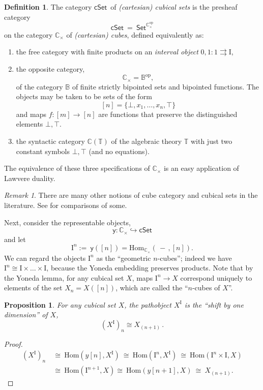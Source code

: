 \documentclass[12pt]{article}
\newcommand{\C}{\ensuremath{\mathbb{C}}}
\newcommand{\B}{\ensuremath{\mathbb{B}}}
\newcommand{\T}{\ensuremath{\mathbb{T}}}
\newcommand{\psh}[1]{\ensuremath{\mathsf{Set}^{#1^{\mathrm{op}}}}}
\newcommand{\op}[1]{\ensuremath{#1^{\mathrm{op}}}}
\newcommand{\cSet}{\ensuremath{\mathsf{cSet}}}
\newcommand{\y}{\ensuremath{\mathsf{y}}} %
\newcommand{\Hom}{\ensuremath{\mathrm{Hom}}}
\renewcommand{\hom}{\ensuremath{\mathrm{Hom}}}
\newcommand{\hook}{\ensuremath{\hookrightarrow}}
\newcommand{\I}{\ensuremath{\mathrm{I}}}
\newtheorem{proposition}[theorem]{Proposition}
\theoremstyle{remark}
\newtheorem{remark}[theorem]{Remark}
\theoremstyle{definition}
\newtheorem{definition}[theorem]{Definition}
\begin{document}
\begin{definition}
The category \cSet\ of \emph{(cartesian) cubical sets} is the presheaf category
\[
\cSet\ =\ \psh{\C_\times}
\]
on the category $\C_\times$ of \emph{(cartesian) cubes}, defined equivalently as:
\begin{enumerate}
\item the free category with finite products on an \emph{interval object} $0,1 : 1\rightrightarrows \I$,
\item the opposite category,
\[
\C_\times = \op{\B},
\]
of the category $\B$ of finite strictly bipointed sets and bipointed functions.  The objects may be taken to be sets of the form $$[n] = \{\bot, x_1, \dots, x_n, \top\}$$ and maps $f : [m]\to [n]$ are functions that preserve the distinguished elements $\bot, \top$.

\item  the syntactic category $\C(\T)$ of the algebraic theory $\T$ with just two constant symbols $\bot, \top$ (and no equations).
\end{enumerate}
The equivalence of these three specifications of $\C_\times$ is an easy application of Lawvere duality.
\end{definition}

\begin{remark} There are many other notions of cube category and cubical sets in the literature. See \cite{awodey:cubes} for  comparisons of some.
\end{remark}

Next, consider the representable objects,
\[
\y : \C_\times \hook \cSet
\]
and let
\[
\I^n :=\  \y([n]) = \Hom_{\C_\times}\!(\,-\,, [n]).
\]
We can regard the objects $\I^n$ as the ``geometric $n$-cubes''; indeed we have $\I^n \cong \I\times\dots\times\I$, because the Yoneda embedding preserves products.  Note that by the Yoneda lemma, for any cubical set $X$,  maps $\I^n \to X$ correspond uniquely to elements of the set $X_n = X([n])$, which are called the ``$n$-cubes of $X$''.

\begin{proposition}\label{prop:pathobject}
For any cubical set $X$, the pathobject $X^\I$ is the ``shift by one dimension'' of $X$, 
\[
(X^\I)_n \cong X_{(n+1)}\,.
\]
\end{proposition}

\begin{proof}
\[
\begin{split}
(X^\I)_n\ &\cong\ \hom(y[n], X^\I)\ \cong\ \hom(\I^n, X^\I)\ \cong\ \hom(\I^n\times \I, X)\\
&\cong\ \hom(\I^{n+1}, X)\cong\ \hom(y[n+1], X)\ \cong\ X_{(n+1)}.
\end{split}
\]
\end{proof}
\end{document}
